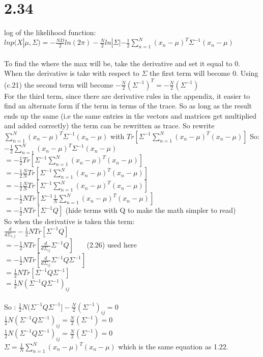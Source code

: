 \documentclass[11pt,leqno,fleqn]{article}
\begin{document}
\section{2.34}
log of the likelihood function:\\
$ln p(X| \mu , \Sigma)  = -\frac{ND}{2} ln(2 \pi) - \frac{N}{2} ln|\Sigma|-  \frac{1}{2} \sum\limits_{n=1}^N (x_n - \mu)^T \Sigma^{-1} (x_n - \mu) $\\
\\
To find the where the max will be, take the derivative and set it equal to 0. When the derivative is take with respect to $\Sigma$ the first term will become 0.
Using (c.21) the second term will become $-\frac{N}{2} (\Sigma^{-1})^T =-\frac{N}{2} (\Sigma^{-1}) $\\
For the third term, since there are derivative rules in the appendix, it easier to find an alternate form if the term in terms of the trace. 
So as long as the result ends up the same (i.e the same entries in the vectors and matrices  get multiplied and added correctly) the term can be rewritten as trace. So rewrite $ \sum\limits_{n=1}^N (x_n - \mu)^T \Sigma^{-1} (x_n - \mu)$ with $ Tr[\Sigma^{-1} \sum\limits_{n=1}^N (x_n - \mu)^T  (x_n - \mu)]$ 
So: \\
$ -  \frac{1}{2} \sum\limits_{n=1}^N (x_n - \mu)^T \Sigma^{-1} (x_n - \mu) $\\
$ =  -  \frac{1}{2}   Tr[\Sigma^{-1} \sum\limits_{n=1}^N (x_n - \mu)^T  (x_n - \mu)]$\\
$ =  -  \frac{1}{2} \frac{N}{N}   Tr[\Sigma^{-1} \sum\limits_{n=1}^N (x_n - \mu)^T  (x_n - \mu)]$\\
$ =  -  \frac{1}{2} \frac{N}{N}   Tr[\Sigma^{-1} \sum\limits_{n=1}^N (x_n - \mu)^T  (x_n - \mu)]$\\
$ =  -  \frac{1}{2} N  Tr[\Sigma^{-1} \frac{1}{N} \sum\limits_{n=1}^N (x_n - \mu)^T  (x_n - \mu)]$\\
$ =  -  \frac{1}{2} N  Tr[\Sigma^{-1} Q]$ (hide  terms with Q to make the math simpler to read)\\
So when the derivative is taken this term:\\
$\frac{d}{d \Sigma_{i,j} } -  \frac{1}{2} N  Tr[\Sigma^{-1} Q]$\\
$ = -  \frac{1}{2} N  Tr[ \frac{d}{d \Sigma_{ij}} \Sigma^{-1} Q]$ \ \ \ (2.26) used here\\
$ = -  \frac{1}{2} N  Tr[ \frac{d}{d \Sigma_{ij}} \Sigma^{-1} Q \Sigma^{-1}]$\\
$ =   \frac{1}{2} N  Tr[ \Sigma^{-1} Q \Sigma^{-1}]$\\
$ =   \frac{1}{2} N  ( \Sigma^{-1} Q \Sigma^{-1})_{ij}$\\
\\
So : $ \frac{1}{2} N ( \Sigma^{-1} Q \Sigma^{-1}] -\frac{N}{2} (\Sigma^{-1})_{ij} = 0$\\
 $ \frac{1}{2} N  ( \Sigma^{-1} Q \Sigma^{-1})_{ij}  = \frac{N}{2} (\Sigma^{-1}) = 0$\\
 $ \frac{1}{2} N  ( \Sigma^{-1} Q \Sigma^{-1})_{ij}  = \frac{N}{2} (\Sigma^{-1}) = 0$\\
$\Sigma  = \frac{1}{N} \sum\limits_{n=1}^N (x_n - \mu)^T  (x_n - \mu)$ which is the same equation as 1.22.\\
\newpage
\end{document}

